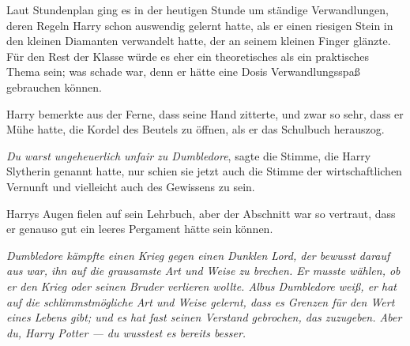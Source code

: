 Laut Stundenplan ging es in der heutigen Stunde um ständige Verwandlungen, deren Regeln Harry schon auswendig gelernt hatte, als er einen riesigen Stein in den kleinen Diamanten verwandelt hatte, der an seinem kleinen Finger glänzte. Für den Rest der Klasse würde es eher ein theoretisches als ein praktisches Thema sein; was schade war, denn er hätte eine Dosis Verwandlungsspaß gebrauchen können.

Harry bemerkte aus der Ferne, dass seine Hand zitterte, und zwar so sehr, dass er Mühe hatte, die Kordel des Beutels zu öffnen, als er das Schulbuch herauszog.

\emph{Du warst ungeheuerlich unfair zu Dumbledore}, sagte die Stimme, die Harry Slytherin genannt hatte, nur schien sie jetzt auch die Stimme der wirtschaftlichen Vernunft und vielleicht auch des Gewissens zu sein.

Harrys Augen fielen auf sein Lehrbuch, aber der Abschnitt war so vertraut, dass er genauso gut ein leeres Pergament hätte sein können.

\emph{Dumbledore kämpfte einen Krieg gegen einen Dunklen Lord, der bewusst darauf aus war, ihn auf die grausamste Art und Weise zu brechen. Er musste wählen, ob er den Krieg oder seinen Bruder verlieren wollte. Albus Dumbledore weiß, er hat auf die schlimmstmögliche Art und Weise gelernt, dass es Grenzen für den Wert eines Lebens gibt; und es hat fast seinen Verstand gebrochen, das zuzugeben. Aber du, Harry Potter — \emph{du} wusstest es bereits besser.}

